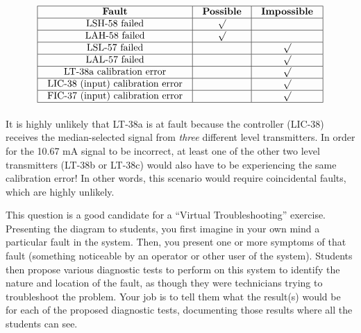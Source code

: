 






$$\vbox{\offinterlineskip
\halign{\strut
\vrule \quad\hfil # \ \hfil & 
\vrule \quad\hfil # \ \hfil & 
\vrule \quad\hfil # \ \hfil \vrule \cr
\noalign{\hrule}
%
{\bf Fault} & {\bf Possible} & {\bf Impossible} \cr
%
\noalign{\hrule}
%
LSH-58 failed & $\surd$ &  \cr
%
\noalign{\hrule}
%
LAH-58 failed & $\surd$ &  \cr
%
\noalign{\hrule}
%
LSL-57 failed &  & $\surd$ \cr
%
\noalign{\hrule}
%
LAL-57 failed &  & $\surd$ \cr
%
\noalign{\hrule}
%
LT-38a calibration error &  & $\surd$ \cr
%
\noalign{\hrule}
%
LIC-38 (input) calibration error &  & $\surd$ \cr
%
\noalign{\hrule}
%
FIC-37 (input) calibration error &  & $\surd$ \cr
%
\noalign{\hrule}
} %
}$$ %

It is highly unlikely that LT-38a is at fault because the controller (LIC-38) receives the median-selected signal from {\it three} different level transmitters.  In order for the 10.67 mA signal to be incorrect, at least one of the other two level transmitters (LT-38b or LT-38c) would also have to be experiencing the same calibration error!  In other words, this scenario would require coincidental faults, which are highly unlikely.







\vskip 10pt

This question is a good candidate for a ``Virtual Troubleshooting'' exercise.  Presenting the diagram to students, you first imagine in your own mind a particular fault in the system.  Then, you present one or more symptoms of that fault (something noticeable by an operator or other user of the system).  Students then propose various diagnostic tests to perform on this system to identify the nature and location of the fault, as though they were technicians trying to troubleshoot the problem.  Your job is to tell them what the result(s) would be for each of the proposed diagnostic tests, documenting those results where all the students can see.

